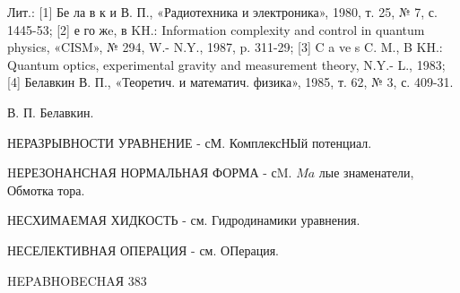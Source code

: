 \documentclass[10pt]{article}
\begin{document}
Лит.: [1] Бе ла в к и В. П., «Радиотехника и электроника», 1980, т. 25, № 7, с. 1445-53; [2] е го жe, в KH.: Information complexity and control in quantum physics, «CISM», № 294, W.- N.Y., 1987, p. 311-29; [3] C a ve s C. M., B KH.: Quantum optics, experimental gravity and measurement theory, N.Y.- L., 1983; [4] Белавкин В. П., «Теоретич. и математич. физика», 1985, т. 62, № 3, с. 409-31.



В. П. Белавкин.



НЕРАЗРЫВНОСТИ УРАВНЕНИЕ - сМ. КомплексНЫй потенциал.



HЕРЕЗОНАНСНАЯ НОРМАЛЬНАЯ ФОРМА - сM. $M a$ лые знаменатели, Обмотка тора.



НЕСХИМАЕМАЯ ХИДКОСТЬ - см. Гидродинамики уравнения.



НЕСЕЛЕКТИВНАЯ ОПЕРАЦИЯ - см. ОПерация.



HEPABHOBECHAЯ 383
\end{document}
